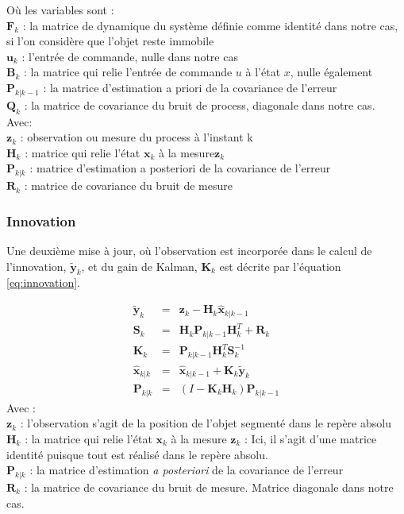 \noindent Où les variables sont :\\
$\textbf{F}_{k}$ : la matrice de dynamique du système définie comme identité dans notre cas, si l'on considère que l'objet reste immobile\\
 $\textbf{u}_{k}$ : l'entrée de commande, nulle dans notre cas\\
 $\textbf{B}_{k}$ : la matrice qui relie l'entrée de commande $u$ à l'état $x$, nulle également\\
$\textbf{P}_{k|k-1}$ : la matrice d'estimation a priori de la covariance de l'erreur \\
$\textbf{Q}_{k}$ : la matrice de covariance du bruit de process, diagonale dans notre cas.\\

\noindent Avec: \\
$\textbf{z}_{k}$ \space \space: observation ou mesure du process à l'instant k \\
$\textbf{H}_{k}$ \space : matrice qui relie l'état $\textbf{x}_{k}$ à la mesure$ \textbf{z}_{k}$\\
$\textbf{P}_{k|k}$ : matrice d'estimation a posteriori de la covariance de l'erreur\\
$\textbf{R}_{k}$ \space \space : matrice de covariance du bruit de mesure

\subsubsection{Innovation}
Une deuxième mise à jour, où l'observation est incorporée dans le calcul de l'innovation, $\tilde{\textbf{y}}_{k}$, et du gain de Kalman, $\textbf{K}_{k}$ est décrite par l'équation \ref{eq:innovation}.

\begin{equation}
	\begin{array}{ccl}
		\tilde{\textbf{y}}_{k} &=& \textbf{z}_{k} - \textbf{H}_{k}\hat{\textbf{x}}_{k|k-1} \\
		\textbf{S}_{k} &=& \textbf{H}_{k}\textbf{P}_{k|k-1} \textbf{H}_{k}^{T}+\textbf{R}_{k} \\
		\textbf{K}_{k} &=& \textbf{P}_{k|k-1}\textbf{H}_{k}^{T}\textbf{S}_{k}^{-1} \\
		\hat{\textbf{x}}_{k|k} &=& \hat{\textbf{x}}_{k|k-1} + \textbf{K}_{k}\tilde{\textbf{y}}_{k} \\
		\textbf{P}_{k|k} &=& (I - \textbf{K}_{k} \textbf{H}_{k}) \textbf{P}_{k|k-1}
	\end{array}
	\label{eq:innovation}
\end{equation}
\noindent Avec :\\
 $\textbf{z}_{k}$ : l'observation s'agit de la position de l'objet segmenté dans le repère absolu\\
$\textbf{H}_{k}$ : la matrice qui relie l'état $\textbf{x}_{k}$ à la mesure $ \textbf{z}_{k}$ : Ici, il s'agit d'une matrice identité puisque tout est réalisé dans le repère absolu.\\
$\textbf{P}_{k|k}$ : la matrice d'estimation \textit{a posteriori} de la covariance de l'erreur\\
$\textbf{R}_{k}$ : la matrice de covariance du bruit de mesure. Matrice diagonale dans notre cas.

